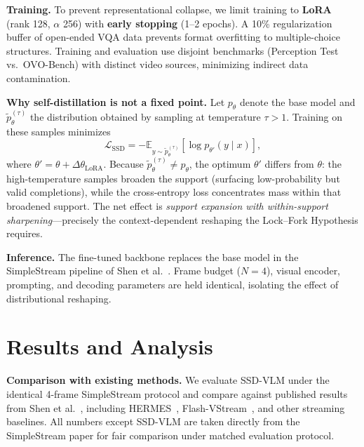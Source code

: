 \documentclass[11pt,a4paper]{article}
\begin{document}
\textbf{Training.} To prevent representational collapse, we limit training to \textbf{LoRA}~\cite{lora} (rank 128, $\alpha$ 256) with \textbf{early stopping} (1--2 epochs). A 10\% regularization buffer of open-ended VQA data prevents format overfitting to multiple-choice structures. Training and evaluation use disjoint benchmarks (Perception Test vs.\ OVO-Bench) with distinct video sources, minimizing indirect data contamination.

\textbf{Why self-distillation is not a fixed point.} Let $p_\theta$ denote the base model and $\tilde{p}_\theta^{(\tau)}$ the distribution obtained by sampling at temperature $\tau > 1$. Training on these samples minimizes
\begin{equation}
\mathcal{L}_{\text{SSD}} = -\mathbb{E}_{y \sim \tilde{p}_\theta^{(\tau)}}[\log p_{\theta'}(y \mid x)],
\label{eq:ssd}
\end{equation}
where $\theta' = \theta + \Delta\theta_{\text{LoRA}}$. Because $\tilde{p}_\theta^{(\tau)} \neq p_\theta$, the optimum $\theta'$ differs from $\theta$: the high-temperature samples broaden the support (surfacing low-probability but valid completions), while the cross-entropy loss concentrates mass within that broadened support. The net effect is \textit{support expansion with within-support sharpening}---precisely the context-dependent reshaping the Lock--Fork Hypothesis requires.

\textbf{Inference.} The fine-tuned backbone replaces the base model in the SimpleStream pipeline of Shen et al.~\cite{simplestream}. Frame budget ($N=4$), visual encoder, prompting, and decoding parameters are held identical, isolating the effect of distributional reshaping.

\section{Results and Analysis}
\textbf{Comparison with existing methods.} We evaluate SSD-VLM under the identical 4-frame SimpleStream protocol and compare against published results from Shen et al.~\cite{simplestream}, including HERMES~\cite{hermes}, Flash-VStream~\cite{flashvstream}, and other streaming baselines. All numbers except SSD-VLM are taken directly from the SimpleStream paper for fair comparison under matched evaluation protocol.
\end{document}

